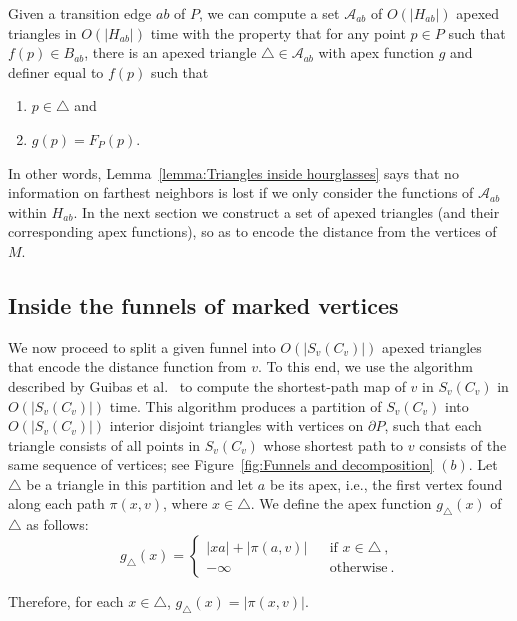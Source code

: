 \documentclass[a4paper,UKenglish]{lipics}
\newcommand{\F}[2]{\ensuremath{F_{\scriptscriptstyle #1}(#2)}}
\newcommand{\fn}[2]{\ensuremath{S_{\scriptscriptstyle #1}(#2)}}
\newcommand{\ff}[1]{\ensuremath{f(#1)}}
\newcommand{\g}[2]{\ensuremath{|\pi(#1, #2)|}}
\newcommand{\p}[2]{\ensuremath{\pi(#1, #2)}}
\begin{document}
\begin{lemma}\label{lemma:Triangles inside hourglasses}
Given a transition edge $ab$ of $P$, we can compute a set $\mathcal A_{ab}$ of $O(|H_{ab}|)$ apexed triangles in $O(|H_{ab}|)$ time with the property that for any point $p\in P$ such that $\ff{p}\in B_{ab}$,
there is an apexed triangle $\triangle\in \mathcal A_{ab}$ with apex function $g$ and definer equal to $\ff{p}$ such that
\begin{enumerate}
\item $p\in \triangle$ and 
\item $g(p) = \F{P}{p}$.
\end{enumerate}
\end{lemma}

In other words, Lemma~\ref{lemma:Triangles inside hourglasses} says that no information on farthest neighbors is lost if we only consider the functions of $\mathcal A_{ab}$ within $H_{ab}$.  
In the next section we construct a set of apexed triangles (and their corresponding apex functions), so as to encode the distance from the vertices of $M$.

\subsection{Inside the funnels of marked vertices}

We now proceed to split a given funnel into $O(|\fn{v}{C_v}|)$ apexed triangles that encode the distance function from $v$. 
To this end, we use the algorithm described by Guibas et al.~\cite[Section 2]{guibasShortestPathQueries} to compute the shortest-path map of $v$ in $\fn{v}{C_v}$ in $O(|\fn{v}{C_v}|)$ time.
This algorithm produces a partition of $\fn{v}{C_v}$ into $O(|\fn{v}{C_v}|)$ interior disjoint triangles with vertices on $\partial P$, such that each triangle consists of all points in $\fn{v}{C_v}$ whose shortest path to $v$ consists of the same sequence of vertices; see Figure~\ref{fig:Funnels and decomposition} $(b)$.
Let $\triangle$ be a triangle in this partition and let $a$ be its apex, i.e., the first vertex found along each path $\p{x}{v}$, where $x\in \triangle$. We define the apex function $g_\triangle(x)$ of $\triangle$ as follows:
$$g_\triangle(x) = \left\{ \begin{array}{lll}
|x a| + \g{a}{v} && \text{if }x\in \triangle\ ,\\
-\infty&&\text{otherwise}\ .
\end{array}\right.$$

Therefore, for each $x\in \triangle$, $g_\triangle(x) = \g{x}{v}$.
\end{document}
